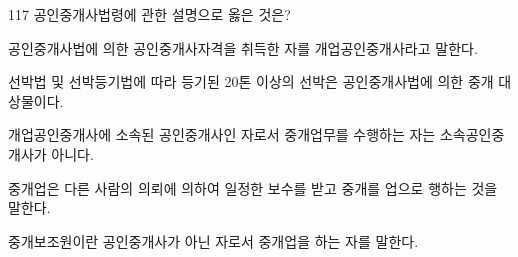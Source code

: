 \begin{question}{117}
공인중개사법령에 관한 설명으로 옳은 것은?
\begin{choices}
  \item 공인중개사법에 의한 공인중개사자격을 취득한 자를 개업공인중개사라고 말한다.
  \item 선박법 및 선박등기법에 따라 등기된 20톤 이상의 선박은 공인중개사법에 의한 중개 대상물이다.
  \item 개업공인중개사에 소속된 공인중개사인 자로서 중개업무를 수행하는 자는 소속공인중개사가 아니다.
  \item 중개업은 다른 사람의 의뢰에 의하여 일정한 보수를 받고 중개를 업으로 행하는 것을 말한다.
  \item 중개보조원이란 공인중개사가 아닌 자로서 중개업을 하는 자를 말한다.
\end{choices}
\end{question}
